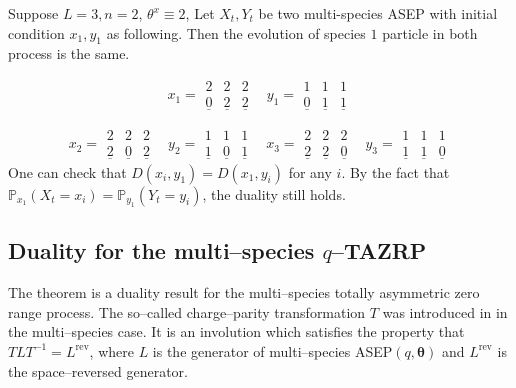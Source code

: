 \documentclass{ximera}
\begin{document}
\begin{example}
Suppose $L=3,n=2$, $\theta^x \equiv 2$, Let $X_t,Y_t$ be two multi-species ASEP with initial condition $x_1,y_1$ as following. Then the evolution of species $1$ particle in both process is the same. 

\begin{equation*}
 x_1=    \begin{matrix}
    2 & 2 & 2\\
   \underline{0}  & \underline{2} &\underline{2}
    \end{matrix}  
\ \ \ \     y_1=    \begin{matrix}
    1 & 1 & 1\\
   \underline{0}  & \underline{1} &\underline{1}
    \end{matrix}
\end{equation*}


\begin{equation*}
 x_2=    \begin{matrix}
    2 & 2 & 2\\
   \underline{2}  & \underline{0} &\underline{2}
    \end{matrix}
\ \ \ \     y_2=    \begin{matrix}
    1 & 1 & 1\\
   \underline{1}  & \underline{0} &\underline{1}
    \end{matrix}
\ \ \ \        x_3=    \begin{matrix}
    2 & 2 & 2\\
   \underline{2}  & \underline{2} &\underline{0}
    \end{matrix}
\ \ \ \     y_3=    \begin{matrix}
    1 & 1 & 1\\
   \underline{1}  & \underline{1} &\underline{0}
    \end{matrix}
\end{equation*}
One can check that $D(x_i,y_1)=D(x_1,y_i)$ for any $i$. 
\newline 
By the fact that $\mathbb{P}_{x_1}(X_t=x_i)=\mathbb{P}_{y_1}(Y_t=y_i)$, the duality still holds. %
\end{example}


\subsection{Duality for the multi--species $q$--TAZRP}
The theorem is a duality result for the multi--species totally asymmetric zero range process. The so--called charge--parity transformation $T$ was introduced in \cite{Kuan-IMRN} in the multi--species case. It is an involution which satisfies the property that $TLT^{-1}=L^{\text{rev}}$, where $L$ is the generator of multi--species ASEP$(q, \boldsymbol\theta)$ and $L^{\text{rev}}$ is the space--reversed generator.
\end{document}
